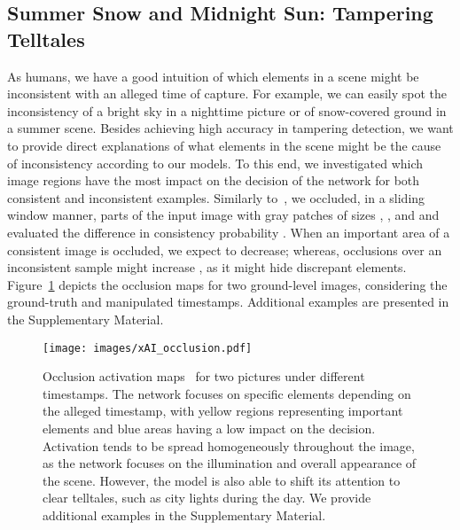 \documentclass[journal]{IEEEtran}
\begin{document}
        
        
        






    \subsection{Summer Snow and Midnight Sun: Tampering Telltales}\label{sec:xai}
        As humans, we have a good intuition of which elements in a scene might be inconsistent with an alleged time of capture. For example, we can easily spot the inconsistency of a bright sky in a nighttime picture or of snow-covered ground in a summer scene. Besides achieving high accuracy in tampering detection, we want to provide direct explanations of what elements in the scene might be the cause of inconsistency according to our models.  
        To this end, we investigated which image regions have the most impact on the decision of the network for both consistent and inconsistent examples. Similarly to~\cite{zeiler2014visualizing}, we occluded, in a sliding window manner, parts of the input image with gray patches of sizes , ,  and  and evaluated the difference in consistency probability . When an important area of a consistent image is occluded, we expect  to decrease; whereas, occlusions over an inconsistent sample might increase , as it might hide discrepant elements. Figure~\ref{fig:xai_occlusion} depicts the occlusion maps for two ground-level images, considering the ground-truth and manipulated timestamps. Additional examples are presented in the Supplementary Material.
        
        \begin{figure}[!t]
            \centering
            \texttt{[image: images/xAI\_occlusion.pdf]}
            \caption{Occlusion activation maps~\cite{zeiler2014visualizing} for two pictures under different timestamps. The network focuses on specific elements depending on the alleged timestamp, with yellow regions representing important elements and blue areas having a low impact on the decision. Activation tends to be spread homogeneously throughout the image, as the network focuses on the illumination and overall appearance of the scene. However, the model is also able to shift its attention to clear telltales, such as city lights during the day. We provide additional examples in the Supplementary Material.}
            \label{fig:xai_occlusion}
        \end{figure}
        
\end{document}

